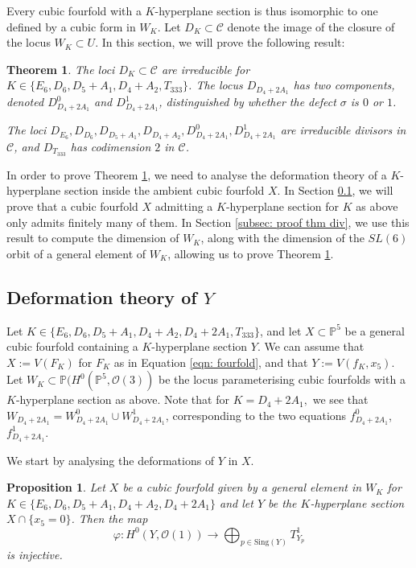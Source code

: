 \documentclass[12pt]{amsart}
\numberwithin{equation}{section}
\theoremstyle{plain}
\newtheorem{theorem}[equation]{Theorem}
\newtheorem{proposition}[equation]{Proposition}
\theoremstyle{remark}
\theoremstyle{definition}
\newcommand{\bP}{\mathbb{P}}
\newcommand{\calC}{\mathcal{C}}
\newcommand{\calO}{\mathcal{O}}
\newcommand{\Sing}{\mathrm{Sing}}
\begin{document}
Every cubic fourfold with a $K$-hyperplane section is thus isomorphic to one defined by a cubic form in $W_K$.
Let $D_{K}\subset\calC$ denote the image of the closure of the locus $W_K\subset U$.
In this section, we will prove the following result:

\begin{theorem}\label{theorem: divisors}
    The loci $D_{K}\subset\calC$ are irreducible for $K\in\{E_6,D_6,D_5+A_1,D_4+A_2,T_{333}\}$. The locus $D_{D_4+2A_1}$ has two components, denoted $D_{D_4+2A_1}^0$ and $D_{D_4+2A_1}^1$, distinguished by whether the defect $\sigma$ is $0$ or $1$.
    
    The loci $D_{E_6}, D_{D_6}, D_{D_5+A_1}, D_{D_4+A_2}, D_{D_4+2A_1}^0, D_{D_4+2A_1}^1$ are irreducible divisors in $\calC$, and $D_{T_{333}}$ has codimension $2$ in $\calC$.
\end{theorem}
In order to prove Theorem \ref{theorem: divisors}, we need to analyse the deformation theory of a $K$-hyperplane section inside the ambient cubic fourfold $X$. In Section \ref{subsec:def theory}, we will prove that a cubic fourfold $X$ admitting a $K$-hyperplane section for $K$ as above only admits finitely many of them. In Section \ref{subsec: proof thm div}, we use this result to compute the dimension of $W_K$, along with the dimension of the $SL(6)$ orbit of a general element of $W_K$, allowing us to prove Theorem \ref{theorem: divisors}.  

\subsection{Deformation theory of \texorpdfstring{$Y$}{Y}}\label{subsec:def theory}

Let $K\in\{E_6, D_6,D_5+A_1, D_4+A_2, D_4+2A_1,  T_{333}\}$, and let $X\subset \bP^5$ be a general cubic fourfold containing a $K$-hyperplane section $Y$. We can assume that $X:=V(F_K)$ for $F_K$ as in Equation \ref{eqn: fourfold}, and that $Y:=V(f_K, x_5)$. 
Let $W_K\subset \bP(H^0(\bP^5, \calO(3))$ be the locus parameterising cubic fourfolds with a $K$-hyperplane section as above. Note that for $K=D_4+2A_1,$ we see that $W_{D_4+2A_1}=W_{D_4+2A_1}^0\cup W_{D_4+2A_1}^1$, corresponding to the two equations $f_{D_4+2A_1}^0$, $f_{D_4+2A_1}^1.$ 

We start by analysing the deformations of $Y$ in $X$. 

\begin{proposition}\label{prop: injectivity}
    Let $X$ be a cubic fourfold given by a general element in $W_{K}$ for $K\in \{E_6, D_6,D_5+A_1, D_4+A_2, D_4+2A_1\}$ and let $Y$ be the $K$-hyperplane section $X\cap \{x_5=0\}$. 
    Then the map
    \[
        \varphi: H^0(Y, \calO(1))\rightarrow \bigoplus_{p\in \Sing(Y)} T^1_{Y_p}
    \]
    is injective.
\end{proposition} 
\end{document}
